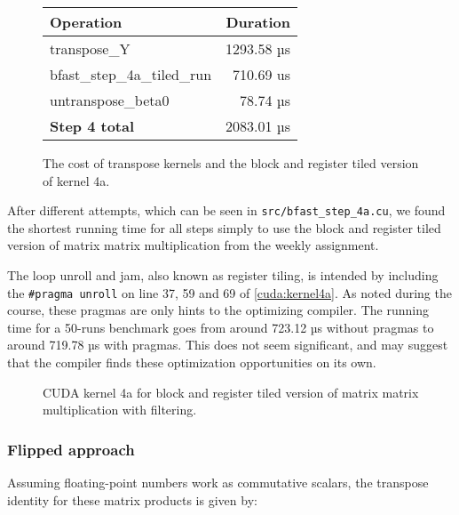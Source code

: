 \begin{figure}[H]
    \centering
    \begin{tabular}{l r}
        \textbf{Operation} & \textbf{Duration} \\ \hline
        transpose\_Y                & 1293.58 µs \\
        bfast\_step\_4a\_tiled\_run & 710.69 us \\
        untranspose\_beta0          & 78.74 µs \\
        \textbf{Step 4 total}              &  2083.01 µs
    \end{tabular}
    \caption{The cost of transpose kernels and the block and register tiled
    version of kernel 4a.}
        \label{tbl:transposecost}
\end{figure}

After different attempts, which can be seen in \texttt{src/bfast\_step\_4a.cu},
we found the shortest running time for all steps simply to use the block and
register tiled version of matrix matrix multiplication from the weekly
assignment. 

The loop unroll and jam, also known as register tiling, is intended by including
the \texttt{\#pragma unroll} on line 37, 59 and 69 of \autoref{cuda:kernel4a}.
As noted during the course, these pragmas are only hints to the optimizing
compiler. The running time for a 50-runs benchmark goes from around 723.12 µs
without pragmas to around 719.78 µs with pragmas. This does not seem
significant, and may suggest that the compiler finds these optimization
opportunities on its own.



\begin{figure}[H]
    \centering
    \caption{CUDA kernel 4a for block and register tiled version of matrix matrix
    multiplication with filtering.}
    \label{cuda:kernel4a}
\end{figure}



\subsubsection{Flipped approach}
Assuming floating-point numbers work as commutative scalars, the transpose
identity for these matrix products is given by:

